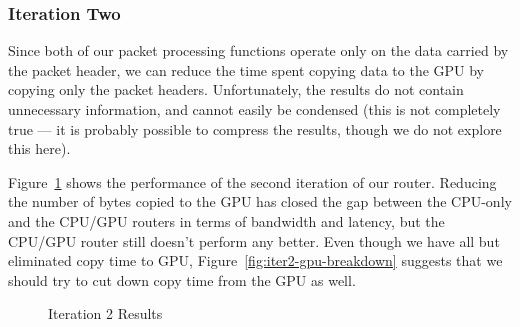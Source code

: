 \subsubsection{Iteration Two}

Since both of our packet processing functions operate only on the data carried
by the packet header, we can reduce the time spent copying data to the GPU by
copying only the packet headers. Unfortunately, the results do not contain
unnecessary information, and cannot easily be condensed (this is not completely
true --- it is probably possible to compress the results, though we do not
explore this here).

Figure~\ref{fig:iter2} shows the performance of the second iteration of our
router. Reducing the number of bytes copied to the GPU has closed the gap
between the CPU-only and the CPU/GPU routers in terms of bandwidth and latency,
but the CPU/GPU router still doesn't perform any better. Even though we have
all but eliminated copy time to GPU, Figure~\ref{fig:iter2-gpu-breakdown}
suggests that we should try to cut down copy time from the GPU as well.

\begin{figure}
    \centering

	\medskip

   	\medskip

    \caption{Iteration 2 Results}
	\label{fig:iter2}
\end{figure}


